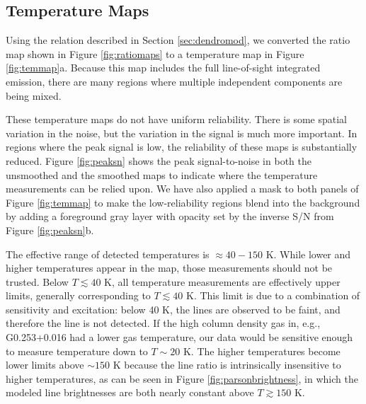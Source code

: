 \subsection{Temperature Maps}
\label{sec:formaldehydetemmap}
Using the relation described in Section \ref{sec:dendromod}, we
converted the ratio map shown in Figure \ref{fig:ratiomaps} to a temperature
map in Figure \ref{fig:temmap}a.  Because this map includes the full line-of-sight
integrated emission, there are many regions where multiple independent components
are being mixed.



These temperature maps do not have uniform reliability.  There
is some spatial variation in the noise, but the variation in the signal is much
more important.  In regions where the peak signal is low, the reliability of
these maps is substantially reduced.  Figure \ref{fig:peaksn} shows the peak
signal-to-noise in both the unsmoothed and the smoothed maps to indicate where
the temperature measurements can be relied upon.  We have also applied a mask
to both panels of Figure \ref{fig:temmap} to make the low-reliability regions
blend into the background by adding a foreground gray layer with opacity set by
the inverse S/N from Figure \ref{fig:peaksn}b.

The effective range of detected temperatures is $\approx40-150$ K. While lower
and higher temperatures appear in the map, those measurements should not be
trusted.  Below $T\lesssim40$ K, all temperature measurements are effectively
upper limits, generally corresponding to $T\lesssim40$ K.  This limit
is due to a combination of sensitivity and excitation: below 40 K, the \para
lines are observed to be faint, and therefore the \threetwoone line is not
detected.  If the high column density gas in, e.g., G0.253+0.016 had a lower
gas temperature, our data would be sensitive enough to measure temperature down
to $T\sim20$ K.  The higher temperatures become lower limits above $\sim150$ K
because the \para line ratio is intrinsically insensitive to higher
temperatures, as can be seen in Figure \ref{fig:parsonbrightness}, in which
the modeled line brightnesses are both nearly constant above $T\gtrsim150$ K.


